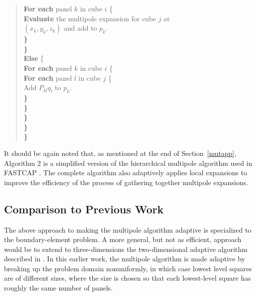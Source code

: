 \begin{singlespace}
\begin{quote}
\begin{tabbing}
\>\>\>\>\> {\bf For each} panel $ k $ in cube $ i $ \{\\
\>\>\>\>\>\> {\bf Evaluate} the multipole expansion for cube $j $ at\\
\>\>\>\>\>\> $(x_k,y_k,z_k)$ and add to $ p_k $.\\
\>\>\>\>\> {\bf \}}\\
\>\>\>\> {\bf \}}\\
\>\>\>\> {\bf Else} \{\\
\>\>\>\>\> {\bf For each} panel $ k $ in cube $ i $ \{\\
\>\>\>\>\>\> {\bf For each} panel $ l $ in cube $ j $ \{\\
\>\>\>\>\>\>\> Add $ P_{kl} q_l $ to $ p_k $.\\
\>\>\>\>\>\> {\bf \}}\\
\>\>\>\>\> {\bf \}}\\
\>\>\>\> {\bf \}}\\
\>\>\> {\bf \}}\\
\>\> {\bf \}}\\
\end{tabbing}
\end{quote}
\end{singlespace}



It should be again noted that, as mentioned at the end of
Section~\ref{mutapp}, Algorithm 2 is a simplified version of the
hierarchical multipole algorithm \cite{carrie,greeng88} used in
FASTCAP \cite{nabors91}. The complete algorithm also adaptively
applies local expansions to improve the efficiency of the process of
gathering together multipole expansions.

\subsection{Comparison to Previous Work}

The above approach to making the multipole algorithm adaptive is
specialized to the boundary-element problem.  A more general, but not
as efficient, approach would be to extend to three-dimensions the
two-dimensional adaptive algorithm described in \cite{carrie}.  In
this earlier work, the multipole algorithm is made adaptive by
breaking up the problem domain nonuniformly, in which case lowest level
squares are of different sizes, where the size is chosen so that
each lowest-level square has roughly the same number of panels.

